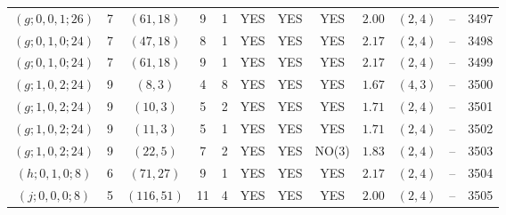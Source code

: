 \begin{longtable}{|c|c|c|c|c|c|c|c|c|c|c|c|}
$(g;0,0,1;26)$ & 7 & $(61,18)$ & 9 & 1 & YES & YES & YES & $2.00$ & $(2,4)$ & -- & 3497\\
$(g;0,1,0;24)$ & 7 & $(47,18)$ & 8 & 1 & YES & YES & YES & $2.17$ & $(2,4)$ & -- & 3498\\
$(g;0,1,0;24)$ & 7 & $(61,18)$ & 9 & 1 & YES & YES & YES & $2.17$ & $(2,4)$ & -- & 3499\\
$(g;1,0,2;24)$ & 9 & $(8,3)$ & 4 & 8 & YES & YES & YES & $1.67$ & $(4,3)$ & -- & 3500\\
$(g;1,0,2;24)$ & 9 & $(10,3)$ & 5 & 2 & YES & YES & YES & $1.71$ & $(2,4)$ & -- & 3501\\
$(g;1,0,2;24)$ & 9 & $(11,3)$ & 5 & 1 & YES & YES & YES & $1.71$ & $(2,4)$ & -- & 3502\\
$(g;1,0,2;24)$ & 9 & $(22,5)$ & 7 & 2 & YES & YES & NO(3) & $1.83$ & $(2,4)$ & -- & 3503\\
$(h;0,1,0;8)$ & 6 & $(71,27)$ & 9 & 1 & YES & YES & YES & $2.17$ & $(2,4)$ & -- & 3504\\
$(j;0,0,0;8)$ & 5 & $(116,51)$ & 11 & 4 & YES & YES & YES & $2.00$ & $(2,4)$ & -- & 3505
\end{longtable}
